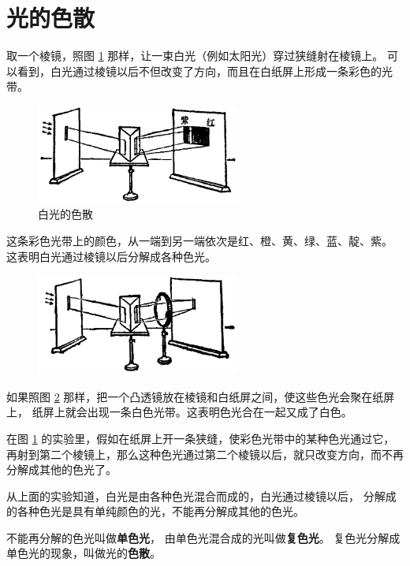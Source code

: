 \section{光的色散}\label{sec:1-9}

取一个棱镜，照图 \ref{fig:1-33} 那样，让一束白光（例如太阳光）穿过狭缝射在棱镜上。
可以看到，白光通过棱镜以后不但改变了方向，而且在白纸屏上形成一条彩色的光带。
\begin{figure}[htbp]
    \centering
    \includegraphics[width=0.6\textwidth]{../pic/czwl2-ch1-33}
    \caption{白光的色散}\label{fig:1-33}
\end{figure}
这条彩色光带上的颜色，从一端到另一端依次是红、橙、黄、绿、蓝、靛、紫。
这表明白光通过棱镜以后分解成各种色光。

\begin{figure}[htbp]
    \centering
    \includegraphics[width=0.6\textwidth]{../pic/czwl2-ch1-34}
    \caption{}\label{fig:1-34}
\end{figure}

如果照图 \ref{fig:1-34} 那样，把一个凸透镜放在棱镜和白纸屏之间，使这些色光会聚在纸屏上，
纸屏上就会出现一条白色光带。这表明色光合在一起又成了白色。

在图 \ref{fig:1-33} 的实验里，假如在纸屏上开一条狭缝，使彩色光带中的某种色光通过它，
再射到第二个棱镜上，那么这种色光通过第二个棱镜以后，就只改变方向，而不再分解成其他的色光了。

从上面的实验知道，白光是由各种色光混合而成的，白光通过棱镜以后，
分解成的各种色光是具有单纯颜色的光，不能再分解成其他的色光。

不能再分解的色光叫做\textbf{单色光}，
由单色光混合成的光叫做\textbf{复色光}。
复色光分解成单色光的现象，叫做光的\textbf{色散}。


